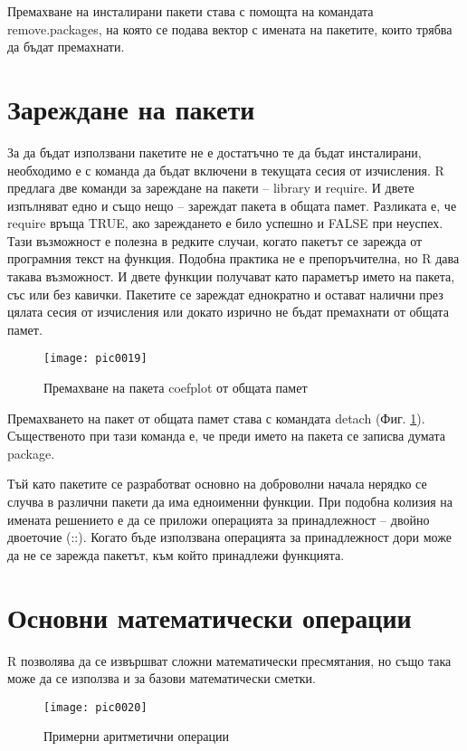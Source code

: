 Премахване на инсталирани пакети става с помощта на командата remove.packages, на която се подава вектор с имената на пакетите, които трябва да бъдат премахнати.

\section{Зареждане на пакети}

За да бъдат използвани пакетите не е достатъчно те да бъдат инсталирани, необходимо е с команда да бъдат включени в текущата сесия от изчисления. R предлага две команди за зареждане на пакети – library и require. И двете изпълняват едно и също нещо – зареждат пакета в общата памет. Разликата е, че require връща TRUE, ако зареждането е било успешно и FALSE при неуспех. Тази възможност е полезна в редките случаи, когато пакетът се зарежда от програмния текст на функция. Подобна практика не е препоръчителна, но R дава такава възможност. И двете функции получават като параметър името на пакета, със или без кавички. Пакетите се зареждат еднократно и остават налични през цялата сесия от изчисления или докато изрично не бъдат премахнати от общата памет.

\begin{figure}[h!]
  \centering
  \texttt{[image: pic0019]}
  \caption{Премахване на пакета coefplot от общата памет}
\label{figure0019}
\end{figure}
\FloatBarrier

Премахването на пакет от общата памет става с командата detach (Фиг. \ref{figure0019}). Същественото при тази команда е, че преди името на пакета се записва думата package.

Тъй като пакетите се разработват основно на доброволни начала нерядко се случва в различни пакети да има едноименни функции. При подобна колизия на имената решението е да се приложи операцията за принадлежност – двойно двоеточие (::). Когато бъде използвана операцията за принадлежност дори може да не се зарежда пакетът, към който принадлежи функцията.

\section{Основни математически операции}

R позволява да се извършват сложни математически пресмятания, но също така може да се използва и за базови математически сметки. 

\begin{figure}[h!]
  \centering
  \texttt{[image: pic0020]}
  \caption{Примерни аритметични операции}
\label{figure0020}
\end{figure}
\FloatBarrier

